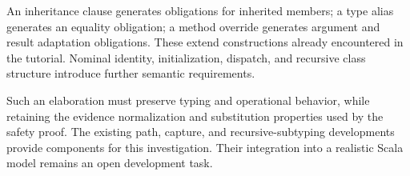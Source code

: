 An inheritance clause generates obligations for inherited members;
a type alias generates an equality obligation; a method override
generates argument and result adaptation obligations.
These extend constructions already encountered in the tutorial.
Nominal identity, initialization, dispatch, and recursive class
structure introduce further semantic requirements.

Such an elaboration must preserve typing and operational behavior,
while retaining the evidence normalization and substitution properties
used by the safety proof.
The existing path, capture, and recursive-subtyping developments provide
components for this investigation. Their integration into a realistic
Scala model remains an open development task.

